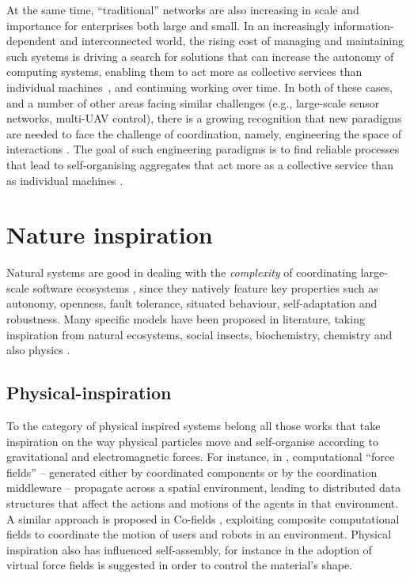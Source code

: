 \documentclass[12pt,a4paper,twoside,openright]{book}
\begin{document}
At the same time, ``traditional'' networks are also increasing in scale and importance for enterprises both large and small.
%
In an increasingly information-dependent and interconnected world, the rising cost of managing and maintaining such systems is driving a search for solutions that can increase the autonomy of computing systems, enabling them to act more as collective services than individual machines~\cite{eze2012autonomic, hu2011cloudreview}, and continuing working over time.
%
In both of these cases, and a number of other areas facing similar challenges (e.g., large-scale sensor networks, multi-UAV control), there is a growing recognition that new paradigms are needed to face the challenge of coordination, namely, engineering the space of interactions \cite{Wegner}.
%
The goal of such engineering paradigms is to find reliable processes that lead to self-organising aggregates that act more as a collective service than as individual machines \cite{Cabri03,Bis11,Social12,PSC13}.

\section{Nature inspiration}

Natural systems are good in dealing with the \emph{complexity} of coordinating large-scale software ecosystems \cite{nic-ieeeis19,facets,nic-cacm49}, since they natively feature key properties such as autonomy, openness, fault tolerance, situated behaviour, self-adaptation and robustness.
%
Many specific models have been proposed in literature, taking inspiration from natural ecosystems, social insects, biochemistry, chemistry and also physics \cite{ecosystems-jpcc7}.

\subsection{Physical-inspiration}

To the category of physical inspired systems belong all those works that take inspiration on the way physical particles move and self-organise according to gravitational and electromagnetic forces.
%
For instance, in \cite{fieldbasedcoordination-mamei06}, computational ``force fields'' -- generated either by coordinated components or by the coordination middleware -- propagate across a spatial environment, leading to distributed data structures that affect the actions and motions of the agents in that environment.
%
A similar approach is proposed in Co-fields \cite{cofields--esawIII}, exploiting composite computational fields to coordinate the motion of users and robots in an environment.
%
Physical inspiration also has influenced self-assembly, for instance in \cite{guo2012} the adoption of virtual force fields is suggested in order to control the material's shape.
\end{document}
